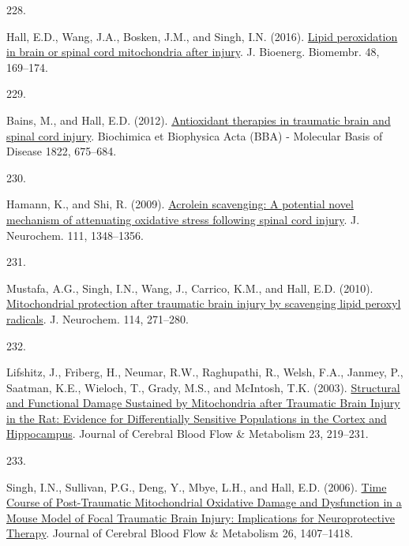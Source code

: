 \documentclass[
]{article}
\newlength{\cslhangindent}
\newlength{\csllabelwidth}
\newlength{\cslentryspacingunit} %
\newenvironment{CSLReferences}[2] %
 {%
  \setlength{\parindent}{0pt}
  \ifodd #1
  \let\oldpar\par
  \def\par{\hangindent=\cslhangindent\oldpar}
  \fi
  \setlength{\parskip}{#2\cslentryspacingunit}
 }%
 {}
\newcommand{\CSLLeftMargin}[1]{\parbox[t]{\csllabelwidth}{#1}}
\newcommand{\CSLRightInline}[1]{\parbox[t]{\linewidth - \csllabelwidth}{#1}\break}
\begin{document}
\begin{CSLReferences}{0}{0}
\leavevmode{}%
\CSLLeftMargin{228. }
\CSLRightInline{Hall, E.D., Wang, J.A., Bosken, J.M., and Singh, I.N. (2016). \href{https://doi.org/10.1007/s10863-015-9600-5}{Lipid peroxidation in brain or spinal cord mitochondria after injury}. J. Bioenerg. Biomembr. 48, 169--174.}

\leavevmode{}%
\CSLLeftMargin{229. }
\CSLRightInline{Bains, M., and Hall, E.D. (2012). \href{https://doi.org/10.1016/j.bbadis.2011.10.017}{Antioxidant therapies in traumatic brain and spinal cord injury}. Biochimica et Biophysica Acta (BBA) - Molecular Basis of Disease 1822, 675--684.}

\leavevmode{}%
\CSLLeftMargin{230. }
\CSLRightInline{Hamann, K., and Shi, R. (2009). \href{https://doi.org/10.1111/j.1471-4159.2009.06395.x}{Acrolein scavenging: A potential novel mechanism of attenuating oxidative stress following spinal cord injury}. J. Neurochem. 111, 1348--1356.}

\leavevmode{}%
\CSLLeftMargin{231. }
\CSLRightInline{Mustafa, A.G., Singh, I.N., Wang, J., Carrico, K.M., and Hall, E.D. (2010). \href{https://doi.org/10.1111/j.1471-4159.2010.06749.x}{Mitochondrial protection after traumatic brain injury by scavenging lipid peroxyl radicals}. J. Neurochem. 114, 271--280.}

\leavevmode{}%
\CSLLeftMargin{232. }
\CSLRightInline{Lifshitz, J., Friberg, H., Neumar, R.W., Raghupathi, R., Welsh, F.A., Janmey, P., Saatman, K.E., Wieloch, T., Grady, M.S., and McIntosh, T.K. (2003). \href{https://doi.org/10.1097/01.WCB.0000040581.43808.03}{Structural and {Functional Damage Sustained} by {Mitochondria} after {Traumatic Brain Injury} in the {Rat}: {Evidence} for {Differentially Sensitive Populations} in the {Cortex} and {Hippocampus}}. Journal of Cerebral Blood Flow \& Metabolism 23, 219--231.}

\leavevmode{}%
\CSLLeftMargin{233. }
\CSLRightInline{Singh, I.N., Sullivan, P.G., Deng, Y., Mbye, L.H., and Hall, E.D. (2006). \href{https://doi.org/10.1038/sj.jcbfm.9600297}{Time {Course} of {Post-Traumatic Mitochondrial Oxidative Damage} and {Dysfunction} in a {Mouse Model} of {Focal Traumatic Brain Injury}: {Implications} for {Neuroprotective Therapy}}. Journal of Cerebral Blood Flow \& Metabolism 26, 1407--1418.}


\end{CSLReferences}
\end{document}
